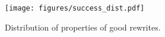 \begin{figure}
    \centering
    \texttt{[image: figures/success\_dist.pdf]}
    \caption{Distribution of properties of good rewrites.}
    \label{fig:success}
\end{figure}